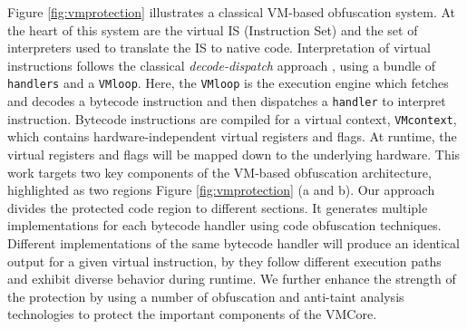 Figure \ref{fig:vmprotection} illustrates a classical VM-based obfuscation system. 
At the heart of this system are the virtual IS (Instruction Set) and the set of interpreters used
to translate the IS to native code.
Interpretation of virtual instructions follows the classical \textit{decode-dispatch} approach \cite{ghosh2012replacement},
using a bundle of \texttt{handlers} and a \texttt{VMloop}.
Here, the \texttt{VMloop} is the execution engine which fetches and decodes a bytecode instruction and then dispatches a \texttt{handler} to interpret instruction.
Bytecode instructions are compiled for a virtual context,  \texttt{VMcontext}, which contains hardware-independent virtual registers and flags.
At runtime, the virtual registers and flags will be mapped down to the underlying hardware. 
This work targets two key components of the VM-based obfuscation architecture, highlighted as two regions Figure \ref{fig:vmprotection} (a and b). 
Our approach divides the protected code region to different sections. It generates
multiple implementations for each bytecode handler using code obfuscation techniques. Different implementations 
of the same bytecode handler will produce an identical output for a given virtual instruction, by they follow different execution paths and exhibit 
diverse behavior during runtime. We further enhance the strength of the protection by using a number of obfuscation and anti-taint analysis technologies to protect the important components of the VMCore.



